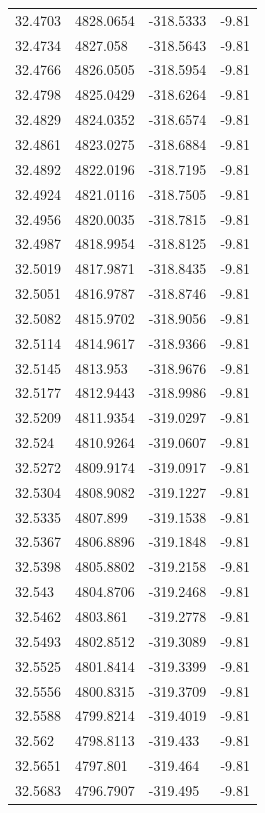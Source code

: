 \begin{table}[H]
\begin{tabular}{llll}
32.4703 & 4828.0654 & -318.5333 & -9.81 \\
32.4734 & 4827.058 & -318.5643 & -9.81 \\
32.4766 & 4826.0505 & -318.5954 & -9.81 \\
32.4798 & 4825.0429 & -318.6264 & -9.81 \\
32.4829 & 4824.0352 & -318.6574 & -9.81 \\
32.4861 & 4823.0275 & -318.6884 & -9.81 \\
32.4892 & 4822.0196 & -318.7195 & -9.81 \\
32.4924 & 4821.0116 & -318.7505 & -9.81 \\
32.4956 & 4820.0035 & -318.7815 & -9.81 \\
32.4987 & 4818.9954 & -318.8125 & -9.81 \\
32.5019 & 4817.9871 & -318.8435 & -9.81 \\
32.5051 & 4816.9787 & -318.8746 & -9.81 \\
32.5082 & 4815.9702 & -318.9056 & -9.81 \\
32.5114 & 4814.9617 & -318.9366 & -9.81 \\
32.5145 & 4813.953 & -318.9676 & -9.81 \\
32.5177 & 4812.9443 & -318.9986 & -9.81 \\
32.5209 & 4811.9354 & -319.0297 & -9.81 \\
32.524 & 4810.9264 & -319.0607 & -9.81 \\
32.5272 & 4809.9174 & -319.0917 & -9.81 \\
32.5304 & 4808.9082 & -319.1227 & -9.81 \\
32.5335 & 4807.899 & -319.1538 & -9.81 \\
32.5367 & 4806.8896 & -319.1848 & -9.81 \\
32.5398 & 4805.8802 & -319.2158 & -9.81 \\
32.543 & 4804.8706 & -319.2468 & -9.81 \\
32.5462 & 4803.861 & -319.2778 & -9.81 \\
32.5493 & 4802.8512 & -319.3089 & -9.81 \\
32.5525 & 4801.8414 & -319.3399 & -9.81 \\
32.5556 & 4800.8315 & -319.3709 & -9.81 \\
32.5588 & 4799.8214 & -319.4019 & -9.81 \\
32.562 & 4798.8113 & -319.433 & -9.81 \\
32.5651 & 4797.801 & -319.464 & -9.81 \\
32.5683 & 4796.7907 & -319.495 & -9.81 \\

\end{tabular}
\end{table}
